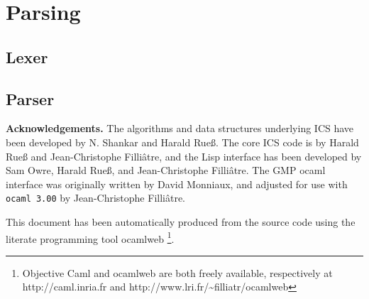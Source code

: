 \documentclass[12pt]{article}
\begin{document}
\section{Parsing}\label{sec:parsing}
  \subsection{Lexer}\label{subsec:lexer}
 
  

  \subsection{Parser}\label{subsec:parser}
 
  



\vspace{10mm}
{\bf Acknowledgements.}
The algorithms and data structures underlying ICS have been
developed by N. Shankar and Harald Rue{\ss}\@. The core ICS code is
by  Harald Rue{\ss} and Jean-Christophe Filli{\^a}tre, and the Lisp
interface has been developed by Sam Owre, Harald Rue{\ss}, and
Jean-Christophe Filli{\^a}tre. The GMP ocaml interface was originally
written by David Monniaux, and adjusted for use with \texttt{ocaml 3.00} by
Jean-Christophe Filli{\^a}tre.

 This document has been automatically produced
from the source code using the literate programming tool \textsf{ocamlweb}%
\footnote{\textsf{Objective Caml} and
  \textsf{ocamlweb} are both freely available, respectively at
  \textsf{http://caml.inria.fr} and
  \textsf{http://www.lri.fr/\~{}filliatr/ocamlweb}}.




\end{document}
